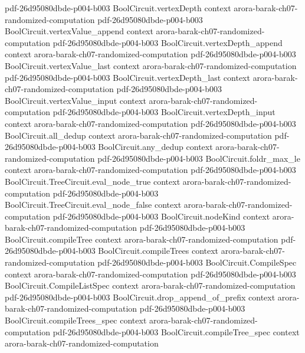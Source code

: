 \begin{theorem}
  {pdf-26d95080dbde-p004-b003}
\proofstep
  {BoolCircuit.vertexDepth}
  {context}
  {arora-barak-ch07-randomized-computation}
  {pdf-26d95080dbde-p004-b003}
\proofstep
  {BoolCircuit.vertexValue_append}
  {context}
  {arora-barak-ch07-randomized-computation}
  {pdf-26d95080dbde-p004-b003}
\proofstep
  {BoolCircuit.vertexDepth_append}
  {context}
  {arora-barak-ch07-randomized-computation}
  {pdf-26d95080dbde-p004-b003}
\proofstep
  {BoolCircuit.vertexValue_last}
  {context}
  {arora-barak-ch07-randomized-computation}
  {pdf-26d95080dbde-p004-b003}
\proofstep
  {BoolCircuit.vertexDepth_last}
  {context}
  {arora-barak-ch07-randomized-computation}
  {pdf-26d95080dbde-p004-b003}
\proofstep
  {BoolCircuit.vertexValue_input}
  {context}
  {arora-barak-ch07-randomized-computation}
  {pdf-26d95080dbde-p004-b003}
\proofstep
  {BoolCircuit.vertexDepth_input}
  {context}
  {arora-barak-ch07-randomized-computation}
  {pdf-26d95080dbde-p004-b003}
\proofstep
  {BoolCircuit.all_dedup}
  {context}
  {arora-barak-ch07-randomized-computation}
  {pdf-26d95080dbde-p004-b003}
\proofstep
  {BoolCircuit.any_dedup}
  {context}
  {arora-barak-ch07-randomized-computation}
  {pdf-26d95080dbde-p004-b003}
\proofstep
  {BoolCircuit.foldr_max_le}
  {context}
  {arora-barak-ch07-randomized-computation}
  {pdf-26d95080dbde-p004-b003}
\proofstep
  {BoolCircuit.TreeCircuit.eval_node_true}
  {context}
  {arora-barak-ch07-randomized-computation}
  {pdf-26d95080dbde-p004-b003}
\proofstep
  {BoolCircuit.TreeCircuit.eval_node_false}
  {context}
  {arora-barak-ch07-randomized-computation}
  {pdf-26d95080dbde-p004-b003}
\proofstep
  {BoolCircuit.nodeKind}
  {context}
  {arora-barak-ch07-randomized-computation}
  {pdf-26d95080dbde-p004-b003}
\proofstep
  {BoolCircuit.compileTree}
  {context}
  {arora-barak-ch07-randomized-computation}
  {pdf-26d95080dbde-p004-b003}
\proofstep
  {BoolCircuit.compileTrees}
  {context}
  {arora-barak-ch07-randomized-computation}
  {pdf-26d95080dbde-p004-b003}
\proofstep
  {BoolCircuit.CompileSpec}
  {context}
  {arora-barak-ch07-randomized-computation}
  {pdf-26d95080dbde-p004-b003}
\proofstep
  {BoolCircuit.CompileListSpec}
  {context}
  {arora-barak-ch07-randomized-computation}
  {pdf-26d95080dbde-p004-b003}
\proofstep
  {BoolCircuit.drop_append_of_prefix}
  {context}
  {arora-barak-ch07-randomized-computation}
  {pdf-26d95080dbde-p004-b003}
\proofstep
  {BoolCircuit.compileTrees_spec}
  {context}
  {arora-barak-ch07-randomized-computation}
  {pdf-26d95080dbde-p004-b003}
\proofstep
  {BoolCircuit.compileTree_spec}
  {context}
  {arora-barak-ch07-randomized-computation}

\end{theorem}
